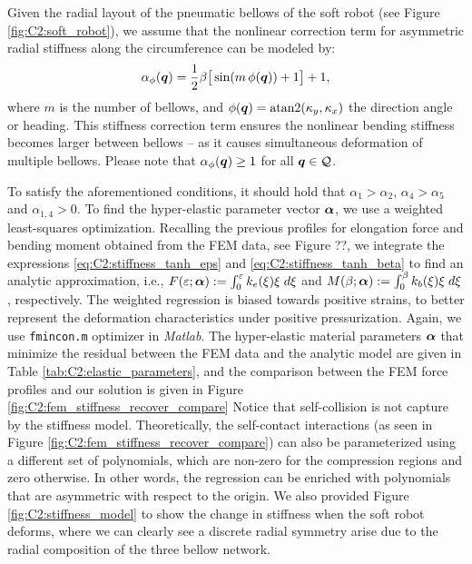 %
\begin{asm}
Given the radial layout of the pneumatic bellows of the soft robot (see Figure \ref{fig:C2:soft_robot}), we assume that the nonlinear correction term for asymmetric radial stiffness along the circumference can be modeled by:
%
\begin{equation}
\alpha_\phi ({\boldsymbol{q}}) = \frac{1}{2}\beta \big[\sin( m \,\phi({\boldsymbol{q}})) + 1 \big] + 1,
\end{equation}
%
where $m$ is the number of bellows, and $\phi({\boldsymbol{q}}) = \text{atan2}(\kappa_y,\kappa_x)$ the direction angle or heading. This stiffness correction term ensures the nonlinear bending stiffness becomes larger between bellows -- as it causes simultaneous deformation of multiple bellows. Please note that $\alpha_\phi({\boldsymbol{q}}) \ge 1$ for all ${\boldsymbol{q}} \in \mathcal{Q}$.
\end{asm}

To satisfy the aforementioned conditions, it should hold that $\alpha_1 > \alpha_2 $, $\alpha_4 > \alpha_5$ and $\alpha_{1,4} > 0$.  To find the hyper-elastic parameter vector ${\boldsymbol{\alpha}}$, we use a weighted least-squares optimization. Recalling the previous profiles for elongation force and bending moment obtained from the FEM data, see Figure ??, we integrate the expressions \eqref{eq:C2:stiffness_tanh_eps} and \eqref{eq:C2:stiffness_tanh_beta} to find an analytic approximation, i.e., $F(\varepsilon; {\boldsymbol{\alpha}}):= \int_0^\varepsilon k_e(\xi) \xi \; d\xi$ and $M(\beta; {\boldsymbol{\alpha}}):= \int_0^\beta k_b(\xi) \xi \; d\xi$, respectively. The weighted regression is biased towards positive strains, to better represent the deformation characteristics under positive pressurization. Again, we use \texttt{fmincon.m} optimizer in \textit{Matlab}. The hyper-elastic material parameters ${\boldsymbol{\alpha}}$ that minimize the residual between the FEM data and the analytic model are given in Table \ref{tab:C2:elastic_parameters}, and the comparison between the FEM force profiles and our solution is given in Figure \ref{fig:C2:fem_stiffness_recover_compare} Notice that self-collision is not capture by the stiffness model. Theoretically, the self-contact interactions (as seen in Figure \ref{fig:C2:fem_stiffness_recover_compare}) can also be parameterized using a different set of polynomials, which are non-zero for the compression regions and zero otherwise. In other words, the regression can be enriched with polynomials that are asymmetric with respect to the origin. We also provided Figure \ref{fig:C2:stiffness_model} to show the change in stiffness when the soft robot deforms, where we can clearly see a discrete radial symmetry arise due to the radial composition of the three bellow network. 



